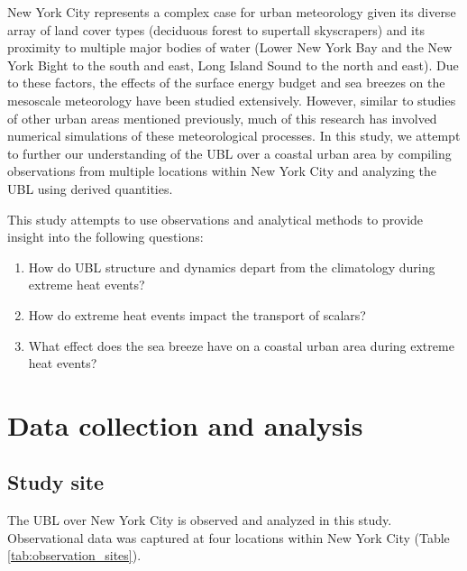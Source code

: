 \documentclass[11pt,a4paper]{article}
\begin{document}

New York City represents a complex case for urban meteorology given its diverse array of land cover types (deciduous forest to supertall skyscrapers) and its proximity to multiple major bodies of water (Lower New York Bay and the New York Bight to the south and east, Long Island Sound to the north and east). Due to these factors, the effects of the surface energy budget \citep{hrisko2021, ramamurthy2014, tewari2019} and sea breezes \citep{childs2005, colle2010, frizzola1963, gedzelman2003, melecio2018, thompson2007} on the mesoscale meteorology have been studied extensively. However, similar to studies of other urban areas mentioned previously, much of this research has involved numerical simulations of these meteorological processes. In this study, we attempt to further our understanding of the UBL over a coastal urban area by compiling observations from multiple locations within New York City and analyzing the UBL using derived quantities.

This study attempts to use observations and analytical methods to provide insight into the following questions:

\begin{enumerate}
  \item How do UBL structure and dynamics depart from the climatology during extreme heat events?
  \item How do extreme heat events impact the transport of scalars?
  \item What effect does the sea breeze have on a coastal urban area during extreme heat events?
\end{enumerate}


\section{Data collection and analysis}

\subsection{Study site}
The UBL over New York City is observed and analyzed in this study. Observational data was captured at four locations within New York City (Table \ref{tab:observation_sites}).
\end{document}
